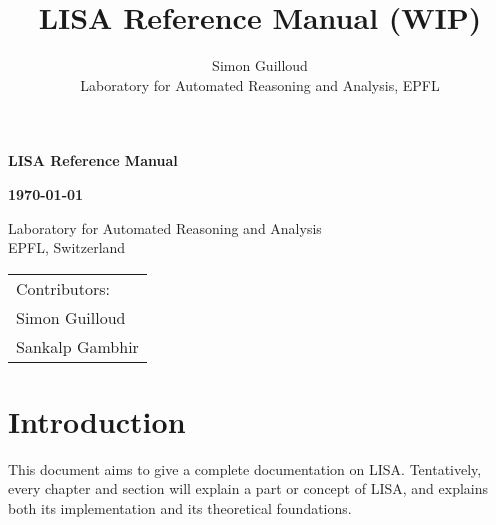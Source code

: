 \documentclass[11pt,a4paper]{book}
\title{LISA Reference Manual (WIP)}
\author{Simon Guilloud\\Laboratory for Automated Reasoning and Analysis, EPFL}
\date{}
\begin{document}
 


\begin{titlepage}

    \begin{center}
        \vspace*{1cm}
 
        \textbf{\Huge LISA Reference Manual}
             
        \vspace{1.5cm}
        
        
        \textbf{\large \today}
             
        \vspace{1.5cm}
 
        {\Large Laboratory for Automated Reasoning and Analysis\\ EPFL, Switzerland}

        \vspace{1.5cm}

        \date{}

    \end{center}
    \vspace*{10em}
    \begin{flushright}\huge
        \begin{tabular}{l}
         Contributors: \hspace*{2em} \\[1em]
         Simon Guilloud\\
         Sankalp Gambhir
        \end{tabular}
    \end{flushright}
             
 \end{titlepage}
\chapter*{Introduction}

This document aims to give a complete documentation on LISA. Tentatively, every chapter and section will explain a part or concept of LISA, and explains both its implementation and its theoretical foundations. 

\tableofcontents













\end{document}
